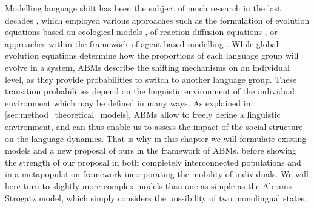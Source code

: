 \documentclass[../thesis.tex]{subfiles}
\begin{document}
Modelling language shift has been the subject of much research in the last decades
\cite{CastellanoStatisticalPhysics2009,BoissonneaultSystematicInterdisciplinary2021},
which employed various approaches such as the formulation of evolution equations based
on ecological models
\cite{MiraInterlinguisticSimilarity2005,PinascoCoexistenceLanguages2006,KandlerEcologicalModels2008,SoleDiversityCompetition2010,HeinsaluRoleBilinguals2014},
of reaction-diffusion equations
\cite{KandlerDemographyLanguage2009,PatriarcaInfluenceGeography2009,IsernLanguageExtinction2014,ProchazkaQuantifyingDriving2017},
or approaches within the framework of agent-based modelling
\cite{CastelloOrderingDynamics2006,MinettModellingEndangered2008,CaridiSchellingvoterModel2013,ProchazkaQuantifyingDriving2017}.
While global evolution equations determine how the proportions of each language group
will evolve in a system, \acp{ABM} describe the shifting mechanisms on an individual
level, as they provide probabilities to switch to another language group. These
transition probabilities depend on the linguistic environment of the individual,
environment which may be defined in many ways.
As explained in \cref{sec:method_theoretical_models}, \acp{ABM} allow to freely define a
linguistic environment, and can thus enable us to assess the impact of the social
structure on the language dynamics. That is why in this chapter we will formulate
existing models and a new proposal of ours in the framework of \acp{ABM}, before showing
the strength of our proposal in both completely interconnected populations and in a
metapopulation framework incorporating the mobility of individuals. We will here turn to
slightly more complex models than one as simple as the Abrams-Strogatz model, which
simply considers the possibility of two monolingual states.
\end{document}
